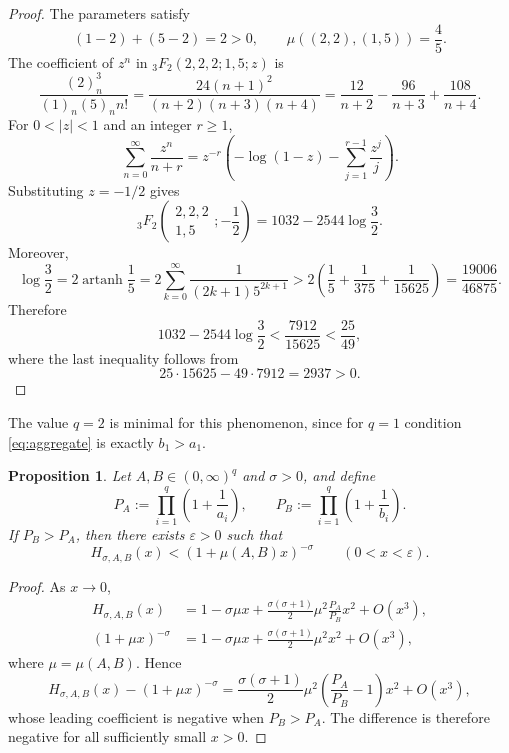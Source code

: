 \documentclass[11pt]{amsart}
\newtheorem{proposition}[theorem]{Proposition}
\begin{document}
\begin{proof}
The parameters satisfy
\[
 (1-2)+(5-2)=2>0,
 \qquad
 \mu((2,2),(1,5))=\frac45.
\]
The coefficient of $z^n$ in ${}_3F_2(2,2,2;1,5;z)$ is
\[
 \frac{(2)_n^3}{(1)_n(5)_n n!}
 =
 \frac{24(n+1)^2}{(n+2)(n+3)(n+4)}
 =
 \frac{12}{n+2}-\frac{96}{n+3}+\frac{108}{n+4}.
\]
For $0<|z|<1$ and an integer $r\ge1$,
\[
 \sum_{n=0}^{\infty}\frac{z^n}{n+r}
 =
 z^{-r}\left(
 -\log(1-z)-\sum_{j=1}^{r-1}\frac{z^j}{j}
 \right).
\]
Substituting $z=-1/2$ gives
\begin{equation}\label{eq:closed}
 {}_3F_2\!\left(
 \begin{matrix}2,2,2\\1,5\end{matrix};-\frac12
 \right)
 =
 1032-2544\log\frac32.
\end{equation}
Moreover,
\[
 \log\frac32
 =
 2\operatorname{artanh}\frac15
 =
 2\sum_{k=0}^{\infty}\frac{1}{(2k+1)5^{2k+1}}
 >
 2\left(\frac15+\frac1{375}+\frac1{15625}\right)
 =
 \frac{19006}{46875}.
\]
Therefore
\[
 1032-2544\log\frac32
 <
 \frac{7912}{15625}
 <
 \frac{25}{49},
\]
where the last inequality follows from
\[
 25\cdot15625-49\cdot7912=2937>0.
\]
\end{proof}

The value $q=2$ is minimal for this phenomenon, since for $q=1$ condition
\eqref{eq:aggregate} is exactly $b_1>a_1$.

\begin{proposition}\label{prop:local}
Let $A,B\in(0,\infty)^q$ and $\sigma>0$, and define
\[
 P_A:=\prod_{i=1}^q\left(1+\frac1{a_i}\right),
 \qquad
 P_B:=\prod_{i=1}^q\left(1+\frac1{b_i}\right).
\]
If $P_B>P_A$, then there exists $\varepsilon>0$ such that
\[
 H_{\sigma,A,B}(x)<(1+\mu(A,B)x)^{-\sigma}
 \qquad (0<x<\varepsilon).
\]
\end{proposition}

\begin{proof}
As $x\to0$,
\begin{align*}
 H_{\sigma,A,B}(x)
 &=
 1-\sigma\mu x
 +\frac{\sigma(\sigma+1)}2
  \mu^2\frac{P_A}{P_B}x^2
 +O(x^3),\\
 (1+\mu x)^{-\sigma}
 &=
 1-\sigma\mu x
 +\frac{\sigma(\sigma+1)}2\mu^2x^2
 +O(x^3),
\end{align*}
where $\mu=\mu(A,B)$. Hence
\[
 H_{\sigma,A,B}(x)-(1+\mu x)^{-\sigma}
 =
 \frac{\sigma(\sigma+1)}2\mu^2
 \left(\frac{P_A}{P_B}-1\right)x^2
 +O(x^3),
\]
whose leading coefficient is negative when $P_B>P_A$. The difference is
therefore negative for all sufficiently small $x>0$.
\end{proof}
\end{document}
